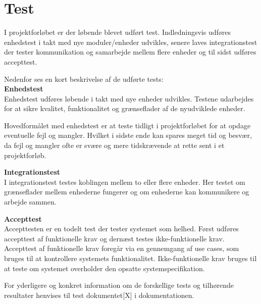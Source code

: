 \section{Test}

\label{chap:test}

I projektforløbet er der løbende blevet udført test. Indledningsvis udføres enhedstest i takt med nye moduler/enheder udvikles, senere laves integrationstest der tester kommunikation og samarbejde mellem flere enheder og til sidst udføres accepttest.

Nedenfor ses en kort beskrivelse af de udførte tests:\\


\textbf{Enhedstest} \\
Enhedstest udføres løbende i takt med nye enheder udvikles. Testene udarbejdes for at sikre kvalitet, funktionalitet og grænseflader af de nyudviklede enheder. 

Hovedformålet med enhedstest er at teste tidligt i projektforløbet for at opdage eventuelle fejl og mangler. Hvilket i sidste ende kan spares meget tid og besvær, da fejl og mangler ofte er svære og mere tidskrævende at rette sent i et projektforløb.


\textbf{Integrationstest} \\
I integrationstest testes koblingen mellem to eller flere enheder. Her testet om grænseflader mellem enhederne fungerer og om enhederne kan kommunikere og arbejde sammen.  



\textbf{Accepttest} \\
Accepttesten er en todelt test der tester systemet som helhed. 
Først udføres accepttest af funktionelle krav og dernæst testes ikke-funktionelle krav.
Accepttest af funktionelle krav foregår via en gennemgang af use cases, som bruges til at kontrollere systemets funktionalitet. Ikke-funktionelle krav bruges til at teste om systemet overholder den opsatte systemspecifikation.  

For yderligere og konkret information om de forskellige tests og tilhørende resultater henvises til test dokumentet[X] i dokumentationen.